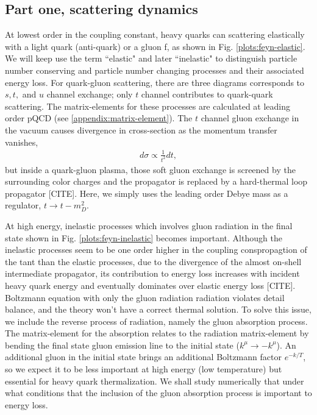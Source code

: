 \documentclass[aps, prc, reprint, amsmath, groupedaddress, nofootinbib]{revtex4-1}
\begin{document}
\subsection{Part one, scattering dynamics}
At lowest order in the coupling constant, heavy quarks can scattering elastically with a light quark (anti-quark) or a gluon f, as shown in Fig. \ref{plots:feyn-elastic}.
We will keep use the term ``elastic" and later ``inelastic" to distinguish particle number conserving and particle number changing processes and their associated energy loss.
For quark-gluon scattering, there are three diagrams corresponds to $s, t,$ and $u$ channel exchange; only $t$ channel contributes to quark-quark scattering.
The matrix-elements for these processes are calculated at leading order pQCD (see \ref{appendix:matrix-element}).
The $t$ channel gluon exchange in the vacuum causes divergence in cross-section as the momentum transfer vanishes,
\begin{eqnarray}
d\sigma \propto \frac{1}{t^2} dt,
\end{eqnarray}
but inside a quark-gluon plasma, those soft gluon exchange is screened by the surrounding color charges and the propagator is replaced by a hard-thermal loop propagator [CITE].
Here, we simply uses the leading order Debye mass as a regulator, $t \rightarrow t - m_D^2$.

At high energy, inelastic processes which involves gluon radiation in the final state shown in Fig. \ref{plots:feyn-inelastic} becomes important.
Although the inelastic processes seem to be one order higher in the coupling conspropagtion of the tant than the elastic processes, due to the divergence of the almost on-shell intermediate propagator, its contribution to energy loss increases with incident heavy quark energy and eventually dominates over elastic energy loss [CITE].
Boltzmann equation with only the gluon radiation radiation violates detail balance, and the theory won't have a correct thermal solution.
To solve this issue, we include the reverse process of radiation, namely the gluon absorption process.
The matrix-element for the absorption relates to the radiation matrix-element by bending the final state gluon emission line to the initial state ($k^\mu \rightarrow -k^\mu$).
An additional gluon in the initial state brings an additional Boltzmann factor $e^{-k/T}$, so we expect it to be less important at high energy (low temperature) but essential for heavy quark thermalization.
We shall study numerically that under what conditions that the inclusion of the gluon absorption process is important to energy loss.
\end{document}
